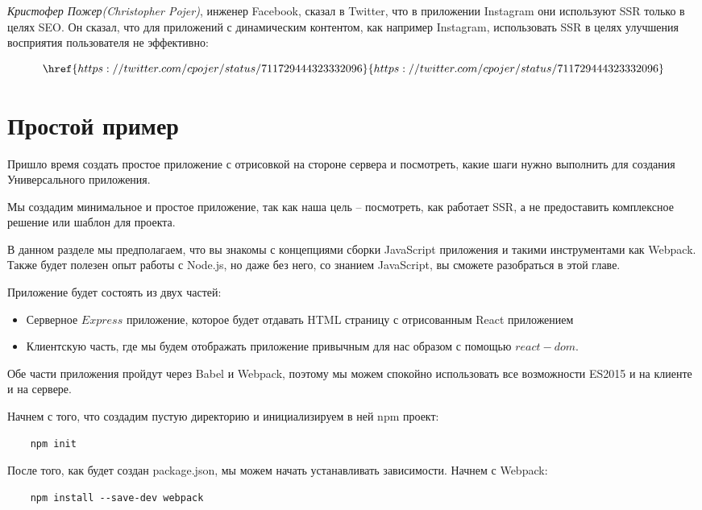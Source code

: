 \textit{Кристофер Пожер(Christopher Pojer)}, инженер Facebook, сказал в Twitter, что в приложении Instagram они используют SSR только в целях SEO. Он сказал, что для приложений с динамическим контентом, как например Instagram, использовать SSR в целях улучшения восприятия пользователя не эффективно:

$$
\href{https://twitter.com/cpojer/status/711729444323332096}{https://twitter.com/cpojer/status/711729444323332096}
$$

\section{Простой пример}

Пришло время создать простое приложение с отрисовкой на стороне сервера и посмотреть, какие шаги нужно выполнить для создания Универсального приложения.

Мы создадим минимальное и простое приложение, так как наша цель -- посмотреть, как работает SSR, а не предоставить комплексное решение или шаблон для проекта.

В данном разделе мы предполагаем, что вы знакомы с концепциями сборки JavaScript приложения и такими инструментами как Webpack. Также будет полезен опыт работы с Node.js, но даже без него, со знанием JavaScript, вы сможете разобраться в этой главе.

Приложение будет состоять из двух частей:

\begin{itemize}
	\item Серверное $Express$ приложение, которое будет отдавать HTML страницу с отрисованным React приложением
	\item Клиентскую часть, где мы будем отображать приложение привычным для нас образом с помощью $react-dom$.
\end{itemize}

Обе части приложения пройдут через Babel и Webpack, поэтому мы можем спокойно использовать все возможности ES2015 и на клиенте и на сервере.

Начнем с того, что создадим пустую директорию и инициализируем в ней npm проект:

\begin{lstlisting}
	npm init
\end{lstlisting}

После того, как будет создан package.json, мы можем начать устанавливать зависимости. Начнем с Webpack:

\begin{lstlisting}
	npm install --save-dev webpack
\end{lstlisting}

